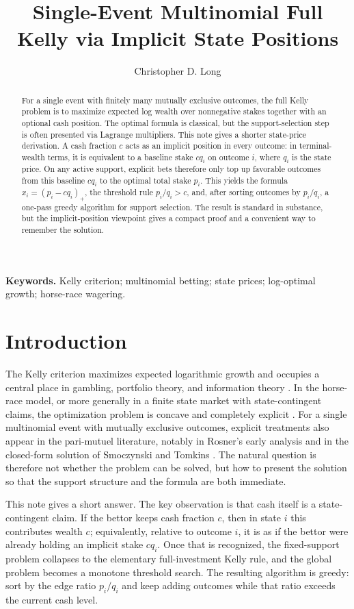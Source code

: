 \documentclass[11pt]{article}
\title{Single-Event Multinomial Full Kelly via Implicit State Positions}
\author{Christopher D. Long}
\date{}
\begin{document}
\maketitle

\begin{abstract}
For a single event with finitely many mutually exclusive outcomes, the full Kelly problem is to maximize expected log wealth over nonnegative stakes together with an optional cash position. The optimal formula is classical, but the support-selection step is often presented via Lagrange multipliers. This note gives a shorter state-price derivation. A cash fraction $c$ acts as an implicit position in every outcome: in terminal-wealth terms, it is equivalent to a baseline stake $cq_i$ on outcome $i$, where $q_i$ is the state price. On any active support, explicit bets therefore only top up favorable outcomes from this baseline $cq_i$ to the optimal total stake $p_i$. This yields the formula $x_i = (p_i - c q_i)_+$, the threshold rule $p_i/q_i > c$, and, after sorting outcomes by $p_i/q_i$, a one-pass greedy algorithm for support selection. The result is standard in substance, but the implicit-position viewpoint gives a compact proof and a convenient way to remember the solution.
\end{abstract}

\medskip
\noindent\textbf{Keywords.} Kelly criterion; multinomial betting; state prices; log-optimal growth; horse-race wagering.

\section{Introduction}
The Kelly criterion maximizes expected logarithmic growth and occupies a central place in gambling, portfolio theory, and information theory \cite{Kelly1956,Breiman1961,Thorp1971,MacLeanThorpZiemba2011}. In the horse-race model, or more generally in a finite state market with state-contingent claims, the optimization problem is concave and completely explicit \cite{CoverThomas2006}. For a single multinomial event with mutually exclusive outcomes, explicit treatments also appear in the pari-mutuel literature, notably in Rosner's early analysis \cite{Rosner1975} and in the closed-form solution of Smoczynski and Tomkins \cite{SmoczynskiTomkins2010}. The natural question is therefore not whether the problem can be solved, but how to present the solution so that the support structure and the formula are both immediate.

This note gives a short answer. The key observation is that cash itself is a state-contingent claim. If the bettor keeps cash fraction $c$, then in state $i$ this contributes wealth $c$; equivalently, relative to outcome $i$, it is as if the bettor were already holding an implicit stake $cq_i$. Once that is recognized, the fixed-support problem collapses to the elementary full-investment Kelly rule, and the global problem becomes a monotone threshold search. The resulting algorithm is greedy: sort by the edge ratio $p_i/q_i$ and keep adding outcomes while that ratio exceeds the current cash level.
\end{document}
